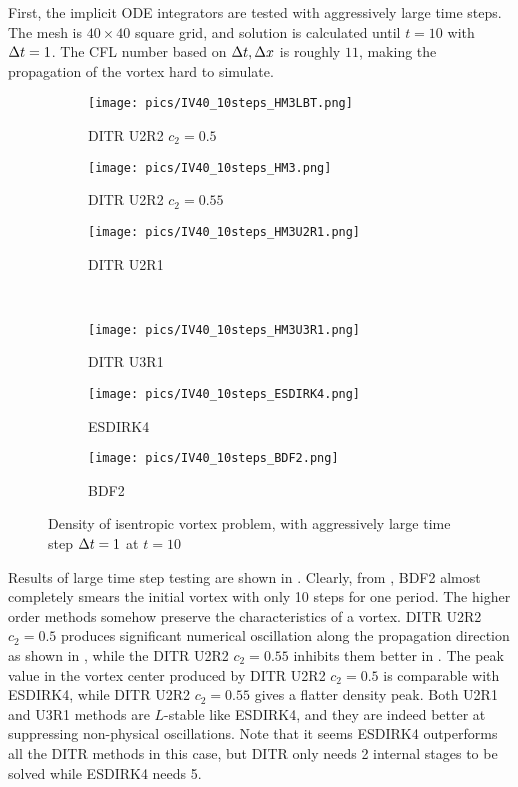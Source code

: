 First, the implicit ODE integrators are tested with aggressively large
time steps.
The mesh is $40\times40$ square grid,
and solution is calculated until $t=10$ with ${\Delta} t=1$.
The CFL number based on ${\Delta} t, {\Delta} x$ is roughly $11$,
making the propagation of the vortex hard to
simulate.

\begin{figure}[htbp]
    \centering
    \begin{subfigure}{0.33\textwidth}
        \texttt{[image: pics/IV40\_10steps\_HM3LBT.png]}
        \caption[]{DITR U2R2 $c_2=0.5$}
        \label{sfig:IV10Step_HM3LBT}
    \end{subfigure}\hfill
    \begin{subfigure}{0.33\textwidth}
        \texttt{[image: pics/IV40\_10steps\_HM3.png]}
        \caption[]{DITR U2R2 $c_2=0.55$}
        \label{sfig:IV10Step_HM3}
    \end{subfigure}\hfill
    \begin{subfigure}{0.33\textwidth}
        \texttt{[image: pics/IV40\_10steps\_HM3U2R1.png]}
        \caption[]{DITR U2R1}
        \label{sfig:IV40_10steps_HM3U2R1}
    \end{subfigure}\\
    \begin{subfigure}{0.33\textwidth}
        \texttt{[image: pics/IV40\_10steps\_HM3U3R1.png]}
        \caption[]{DITR U3R1}
        \label{sfig:IV40_10steps_HM3U3R1}
    \end{subfigure}\hfill
    \begin{subfigure}{0.33\textwidth}
        \texttt{[image: pics/IV40\_10steps\_ESDIRK4.png]}
        \caption[]{ESDIRK4}
        \label{sfig:IV10Step_ESDIRK4}
    \end{subfigure}\hfill
    \begin{subfigure}{0.33\textwidth}
        \texttt{[image: pics/IV40\_10steps\_BDF2.png]}
        \caption[]{BDF2}
        \label{sfig:IV10Step_BDF2}
    \end{subfigure}
    \caption{Density of isentropic vortex problem, with aggressively large time step ${\Delta} t = 1$ at $t=10$}
    \label{fig:IV10Step}
\end{figure}

Results of large time step testing are shown in .
Clearly, from , BDF2 almost completely
smears the initial vortex with only 10 steps for one period.
The higher order methods somehow preserve the characteristics of
a vortex. DITR U2R2 $c_2=0.5$ produces significant numerical oscillation along
the propagation direction as shown in ,
while the DITR U2R2 $c_2=0.55$ inhibits them better in .
The peak value in the vortex center produced by DITR U2R2 $c_2=0.5$ is comparable with
ESDIRK4, while DITR U2R2 $c_2=0.55$ gives a flatter density peak.
Both U2R1 and U3R1 methods are $L$-stable like ESDIRK4, and they
are indeed better at suppressing non-physical oscillations.
Note that it seems ESDIRK4 outperforms all the DITR methods in
this case, but DITR only needs 2 internal stages to be solved while
ESDIRK4 needs 5.

